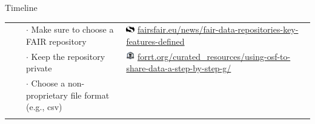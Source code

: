 \begin{block}{Timeline}
\begin{table}[]
\begin{tabular}{rlll}
      &
      & $\cdot$ Make sure to choose a FAIR repository 
      & \href{https://www.fairsfair.eu/news/fair-data-repositories-key-features-defined}{\includegraphics[width=1em]{img/FairIsFairLogo.png}} \href{https://www.fairsfair.eu/news/fair-data-repositories-key-features-defined}{fairsfair.eu/news/fair-data-repositories-key-features-defined}
    \\
    
      &
      &  $\cdot$ Keep the repository private
      & \href{https://forrt.org/curated_resources/using-osf-to-share-data-a-step-by-step-g/}{\includegraphics[width=1em]{img/FORRT.png}}
      \href{https://forrt.org/curated_resources/using-osf-to-share-data-a-step-by-step-g/}{forrt.org/curated\_resources/using-osf-to-share-data-a-step-by-step-g/}
    \\
    
      &
      & $\cdot$ Choose a non-proprietary file format (e.g., csv) 
      & 
    \\
      &&&
    \\

    

\end{tabular}
\end{table}
\end{block}

